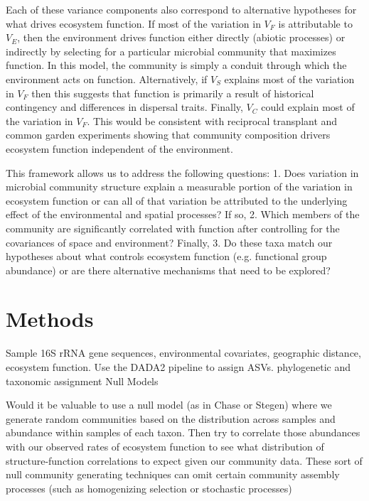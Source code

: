 \documentclass{article}
\begin{document}
Each of these variance components also correspond to alternative hypotheses for
what drives ecosystem function. If most of the variation in $V_F$ is
attributable to $V_E$, then the environment drives function either directly
(abiotic processes) or indirectly by selecting for a particular microbial
community that maximizes function. In this model, the community is simply a 
conduit through which the environment acts on function. Alternatively, if $V_S$
explains most of the variation in $V_F$ then this suggests that function is
primarily a result of historical contingency and differences in dispersal traits.
Finally, $V_C$ could explain most of the variation in $V_F$. This would be
consistent with reciprocal transplant and common garden experiments showing that
community composition drivers ecosystem function independent of the environment.

This framework allows us to address the following questions: 1. Does variation
in microbial community structure explain a measurable portion of the variation in
ecosystem function or can all of that variation be attributed to the underlying
effect of the environmental and spatial processes? If so, 2. Which members of
the community are significantly correlated with function after controlling for
the covariances of space and environment? Finally, 3. Do these taxa match our hypotheses about
what controls ecosystem function (e.g. functional group abundance) or are there
alternative mechanisms that need to be explored?




\section{Methods}

Sample 16S rRNA gene sequences, environmental covariates, geographic distance,
ecosystem function. Use the DADA2 pipeline to assign ASVs. 
phylogenetic and taxonomic assignment Null
Models \citep{chase2011, stegen2015}

Would it be valuable to use a null model (as in Chase or Stegen) where we
generate random communities based on the distribution across samples and
abundance within samples of each taxon. Then try to correlate those abundances
with our observed rates of ecosystem function to see what distribution of
structure-function correlations to expect given our community data. These sort
of null community generating techniques can omit certain community assembly
processes (such as homogenizing selection or stochastic processes)
\end{document}
